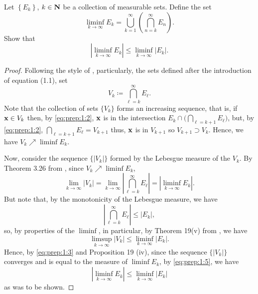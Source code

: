 \begin{problem}
Let $\left\{ E_k \right\}$, $k\in\mathbf{N}$ be a collection of measurable
sets. Define the set
\[
\liminf_{k\to\infty} E_k
=\bigcup_{k=1}^\infty\left(\bigcap_{n=k}^\infty E_n\right).
\]
Show that
\[
\left|\liminf_{k\to\infty} E_k\right|\leq\liminf_{k\to\infty}\left|E_k\right|.
\]
\end{problem}
\begin{proof}
Following the style of \cite[Ch.\@ 1, p.\@ 2]{wheeden-zygmund},
particularly, the sets defined after the introduction of equation (1.1),
set
\begin{equation}
\label{eq:prep:1:2}
V_k\coloneq\bigcap_{\ell=k}^\infty E_\ell.
\end{equation}
Note that the collection of sets $\{V_k\}$ forms an increasing
sequence, that is, if $\mathbf{x}\in V_k$ then, by \eqref{eq:prep:1:2}, $\mathbf{x}$ is
in the intersection $E_k\cap\bigl(\bigcap_{\ell=k+1}E_\ell\bigr)$, but, by
\eqref{eq:prep:1:2}, $\bigcap_{\ell=k+1}E_\ell=V_{k+1}$ thus, $\mathbf{x}$
is in $V_{k+1}$ so $V_{k+1}\supset V_k$. Hence, we have $V_k\nearrow\liminf
E_k$.

Now, consider the sequence $\{|V_k|\}$ formed by the Lebesgue measure of
the $V_k$. By Theorem 3.26 from \cite[Ch.\@ 3, p.\@
51]{wheeden-zygmund}, since $V_k\nearrow\liminf E_k$,
\begin{equation}
  \label{eq:prep:1:3}
\lim_{k\to\infty}|V_k|=
\lim_{k\to\infty}\left|\bigcap_{\ell=k}^\infty E_\ell\right|=
\left|\liminf_{k\to\infty} E_k\right|.
\end{equation}
But note that, by the monotonicity of the Lebesgue measure, we have
\begin{equation}
  \label{eq:prep:1:4}
\left|\bigcap_{\ell=k}^\infty E_\ell\right|\leq |E_k|,
\end{equation}
so, by properties of the $\liminf$, in particular, by Theorem 19(v) from
\cite[Ch.\@ 1, p.\@ 23]{royden}, we have
\begin{equation}
\label{eq:prep:1:5}
\limsup_{k\to\infty}|V_k|\leq\liminf_{k\to\infty}|E_k|.
\end{equation}
Hence, by \eqref{eq:prep:1:3} and Proposition 19 (iv), since the sequence
$\{|V_k|\}$ converges and is equal to the measure of $\liminf E_k$, by
\eqref{eq:prep:1:5}, we have
\begin{equation}
\label{eq:prep:1:6}
\left|\liminf_{k\to\infty} E_k\right|\leq\liminf_{k\to\infty}|E_k|
\end{equation}
as was to be shown.
\end{proof}

